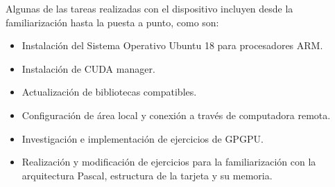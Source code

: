    Algunas de las tareas realizadas con el dispositivo incluyen desde la familiarización hasta la puesta a punto, como son:
   \begin{itemize}
    \item Instalación del Sistema Operativo Ubuntu 18 para procesadores ARM.
     \item Instalación de CUDA manager.
     \item Actualización de bibliotecas compatibles.
     \item Configuración de área local y conexión a través de computadora remota.
      \item Investigación e implementación de ejercicios de GPGPU.
       \item Realización y modificación de ejercicios para la familiarización con la arquitectura Pascal, estructura de la tarjeta y su memoria.
    \end{itemize}   
   
